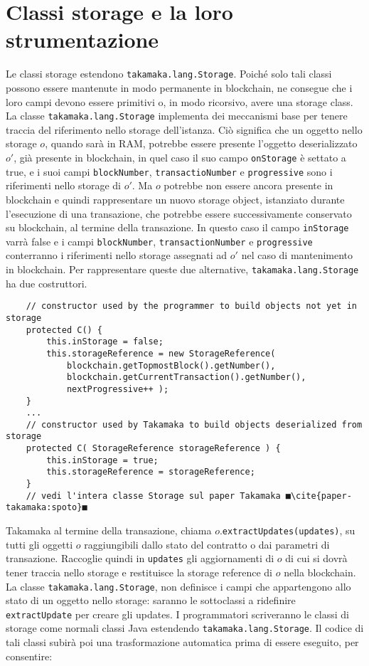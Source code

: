 \section{Classi storage e la loro strumentazione} \label{takamaka:classi-storage-e-la-loro-strumentazione}
Le classi storage estendono \lstinline|takamaka.lang.Storage|. Poiché solo tali classi possono essere mantenute in modo permanente in blockchain, ne consegue che i loro campi devono essere primitivi o, in modo ricorsivo, avere una storage class. La classe \lstinline|takamaka.lang.Storage| implementa dei meccanismi base per tenere traccia del riferimento nello storage dell'istanza. Ciò significa che un oggetto nello storage $o$, quando sarà in RAM, potrebbe essere presente l'oggetto deserializzato $o'$, già presente in blockchain, in quel caso il suo campo \lstinline|onStorage| è settato a true, e i suoi campi \lstinline|blockNumber|, \lstinline|transactioNumber| e \lstinline|progressive| sono i riferimenti nello storage di $o'$. Ma $o$ potrebbe non essere ancora presente in blockchain e quindi rappresentare un nuovo storage object, istanziato durante l'esecuzione di una transazione, che potrebbe essere successivamente conservato su blockchain, al termine della transazione. In questo caso il campo \lstinline|inStorage| varrà false e i campi \lstinline|blockNumber|, \lstinline|transactionNumber| e \lstinline|progressive| conterranno i riferimenti nello storage assegnati ad $o'$ nel caso di mantenimento in blockchain. Per rappresentare queste due alternative, \lstinline|takamaka.lang.Storage| ha due costruttori.
%
\begin{lstlisting}
	// constructor used by the programmer to build objects not yet in storage
	protected C() {
		this.inStorage = false;
		this.storageReference = new StorageReference(
			blockchain.getTopmostBlock().getNumber(),
			blockchain.getCurrentTransaction().getNumber(),
			nextProgressive++ );
	}
	...
	// constructor used by Takamaka to build objects deserialized from storage
	protected C( StorageReference storageReference ) {
		this.inStorage = true;
		this.storageReference = storageReference;
	}
	// vedi l'intera classe Storage sul paper Takamaka ■\cite{paper-takamaka:spoto}■
\end{lstlisting}
%
Takamaka al termine della transazione, chiama $o$.\lstinline|extractUpdates(updates)|, su tutti gli oggetti $o$ raggiungibili dallo stato del contratto o dai parametri di transazione. Raccoglie quindi in \lstinline|updates| gli aggiornamenti di $o$ di cui si dovrà tener traccia nello storage e restituisce la storage reference di $o$ nella blockchain. La classe \lstinline|takamaka.lang.Storage|, non definisce i campi che appartengono allo stato di un oggetto nello storage: saranno le sottoclassi a ridefinire \lstinline|extractUpdate| per creare gli updates. I programmatori scriveranno le classi di storage come normali classi Java estendendo \lstinline|takamaka.lang.Storage|. Il codice di tali classi subirà poi una trasformazione automatica prima di essere eseguito, per consentire:
